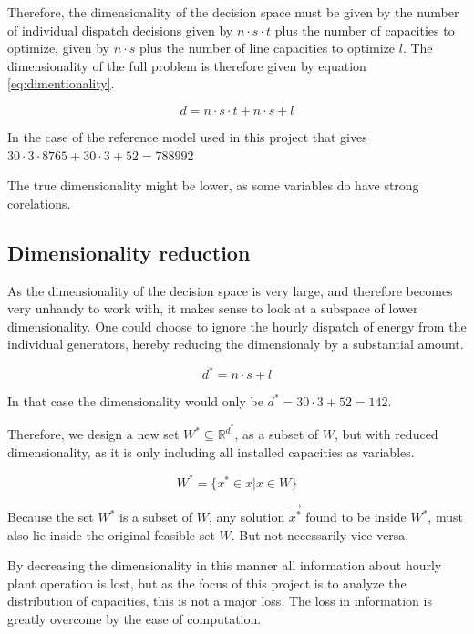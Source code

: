Therefore, the dimensionality of the decision space must be given by the number of individual dispatch decisions given by $n\cdot s \cdot t$ plus the number of capacities to optimize, given by $n\cdot s$ plus the number of line capacities to optimize $l$. The dimensionality of the full problem is therefore given by equation \vref{eq:dimentionality}.

\begin{equation}\label{eq:dimentionality}
d = n\cdot s \cdot t + n\cdot s + l
\end{equation}


In the case of the reference model used in this project that gives 
$ 30 \cdot 3 \cdot 8765 + 30 \cdot 3 + 52 = 788992 $ 


The true dimensionality might be lower, as some variables do have strong corelations. 


\subsection{Dimensionality reduction}\label{sec:dim_reduction}

As the dimensionality of the decision space is very large, and therefore becomes very unhandy to work with, it makes sense to look at a subspace of lower dimensionality. One could choose to ignore the hourly dispatch of energy from the individual generators, hereby reducing the dimensionaly by a substantial amount. 

\begin{equation}
d^* = n\cdot s + l
\end{equation}

In that case the dimensionality would only be $d^* = 30\cdot 3 + 52 = 142$. 

Therefore, we design a new set $W^* \subseteq \mathbb{R}^{d^*}$, as a subset of $W$, but with reduced dimensionality, as it is only including all installed capacities as variables. 

\begin{equation}
W^* = \{ x^* \in x | x \in W \}
\end{equation}

Because the set $W^*$ is a subset of $W$, any solution $\vec{x^*}$ found to be inside $W^*$, must also lie inside the original feasible set $W$. But not necessarily vice versa. 

By decreasing the dimensionality in this manner all information about hourly plant operation is lost, but as the focus of this project is to analyze the distribution of capacities, this is not a major loss. The loss in information is greatly overcome by the ease of computation. 


